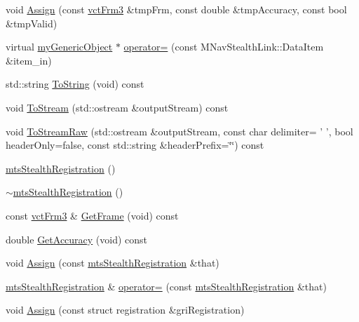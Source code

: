 \begin{DoxyCompactItemize}
\item 
void \hyperlink{classmts_stealth_registration_add68c38da3f107b0a49ed3995b817612}{Assign} (const \hyperlink{vct_transformation_types_8h_a81feda0a02c2d1bc26e5553f409fed20}{vct\-Frm3} \&tmp\-Frm, const double \&tmp\-Accuracy, const bool \&tmp\-Valid)
\item 
virtual \hyperlink{classmy_generic_object}{my\-Generic\-Object} $\ast$ \hyperlink{classmts_stealth_registration_ad01cf3526c41f762655e3898a0751661}{operator=} (const M\-Nav\-Stealth\-Link\-::\-Data\-Item \&item\-\_\-in)
\item 
std\-::string \hyperlink{classmts_stealth_registration_a215e104863a987ea4253519864c2b65d}{To\-String} (void) const 
\item 
void \hyperlink{classmts_stealth_registration_adba3ddfdec70f8ff3212e2cd540cbcf8}{To\-Stream} (std\-::ostream \&output\-Stream) const 
\item 
void \hyperlink{classmts_stealth_registration_acd36e1ba84f6168e0b5151048765888c}{To\-Stream\-Raw} (std\-::ostream \&output\-Stream, const char delimiter= ' ', bool header\-Only=false, const std\-::string \&header\-Prefix=\char`\"{}\char`\"{}) const 
\item 
\hyperlink{classmts_stealth_registration_a81080c46af0e98d66301faf0d50df7a9}{mts\-Stealth\-Registration} ()
\item 
\hyperlink{classmts_stealth_registration_aa67f68f1a4b561db0048bfefc8390809}{$\sim$mts\-Stealth\-Registration} ()
\item 
const \hyperlink{vct_transformation_types_8h_a81feda0a02c2d1bc26e5553f409fed20}{vct\-Frm3} \& \hyperlink{classmts_stealth_registration_a1fe277744997a3d145d9c6afad0e5efa}{Get\-Frame} (void) const 
\item 
double \hyperlink{classmts_stealth_registration_ab0b636a72eb2f9875dde6e3bb1718588}{Get\-Accuracy} (void) const 
\item 
void \hyperlink{classmts_stealth_registration_af5edb0d59e648c60ebf86059a95c271b}{Assign} (const \hyperlink{classmts_stealth_registration}{mts\-Stealth\-Registration} \&that)
\item 
\hyperlink{classmts_stealth_registration}{mts\-Stealth\-Registration} \& \hyperlink{classmts_stealth_registration_a5b1b6941aa8d5dd181bc3f2228563033}{operator=} (const \hyperlink{classmts_stealth_registration}{mts\-Stealth\-Registration} \&that)
\item 
void \hyperlink{classmts_stealth_registration_af865efe13c402e2d1791bfa7cdcea0a8}{Assign} (const struct registration \&gri\-Registration)

\end{DoxyCompactItemize}
